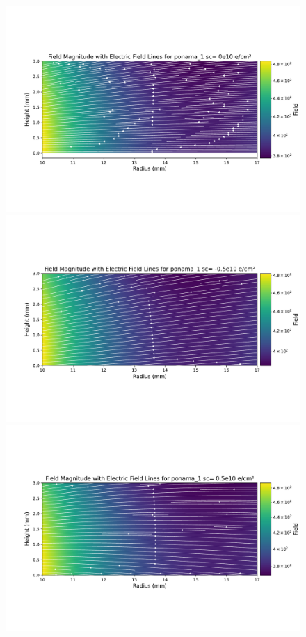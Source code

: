 \begin{figure}
\centering
\includegraphics[trim={1cm 3.5cm 0.5cm 4.0cm},clip,width=0.99\linewidth]{ch3/figs/elect_field_lines_surface_ponama_1_sc_0.pdf}
\includegraphics[trim={1cm 3.5cm 0.5cm 4.0cm},clip,width=0.99\linewidth]{ch3/figs/elect_field_lines_surface_ponama_1_sc_-0.5.pdf}
\includegraphics[trim={1cm 3.5cm 0.5cm 4.0cm},clip,width=0.99\linewidth]{ch3/figs/elect_field_lines_surface_ponama_1_sc_0.5.pdf}

\end{figure}
